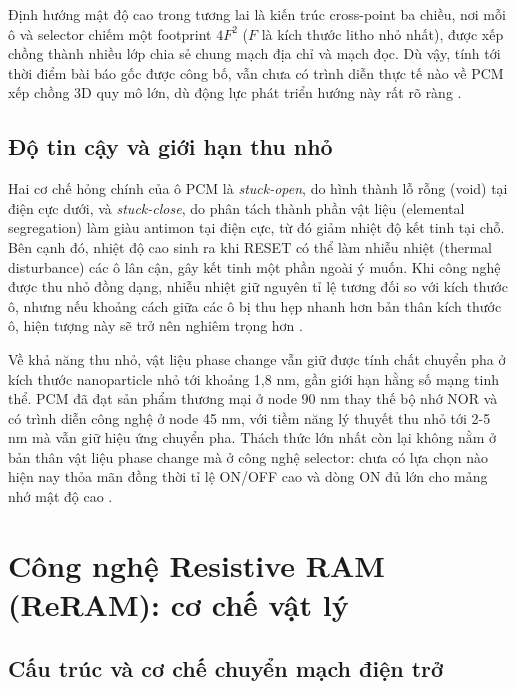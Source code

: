 \documentclass[12pt,a4paper]{article}
\begin{document}
Định hướng mật độ cao trong tương lai là kiến trúc cross-point ba chiều, nơi mỗi ô và selector chiếm một footprint $4F^2$ ($F$ là kích thước litho nhỏ nhất), được xếp chồng thành nhiều lớp chia sẻ chung mạch địa chỉ và mạch đọc. Dù vậy, tính tới thời điểm bài báo gốc được công bố, vẫn chưa có trình diễn thực tế nào về PCM xếp chồng 3D quy mô lớn, dù động lực phát triển hướng này rất rõ ràng \cite{wong2010}.

\subsection{Độ tin cậy và giới hạn thu nhỏ}

Hai cơ chế hỏng chính của ô PCM là \textit{stuck-open}, do hình thành lỗ rỗng (void) tại điện cực dưới, và \textit{stuck-close}, do phân tách thành phần vật liệu (elemental segregation) làm giàu antimon tại điện cực, từ đó giảm nhiệt độ kết tinh tại chỗ. Bên cạnh đó, nhiệt độ cao sinh ra khi RESET có thể làm nhiễu nhiệt (thermal disturbance) các ô lân cận, gây kết tinh một phần ngoài ý muốn. Khi công nghệ được thu nhỏ đồng dạng, nhiễu nhiệt giữ nguyên tỉ lệ tương đối so với kích thước ô, nhưng nếu khoảng cách giữa các ô bị thu hẹp nhanh hơn bản thân kích thước ô, hiện tượng này sẽ trở nên nghiêm trọng hơn \cite{wong2010}.

Về khả năng thu nhỏ, vật liệu phase change vẫn giữ được tính chất chuyển pha ở kích thước nanoparticle nhỏ tới khoảng 1,8 nm, gần giới hạn hằng số mạng tinh thể. PCM đã đạt sản phẩm thương mại ở node 90 nm thay thế bộ nhớ NOR và có trình diễn công nghệ ở node 45 nm, với tiềm năng lý thuyết thu nhỏ tới 2-5 nm mà vẫn giữ hiệu ứng chuyển pha. Thách thức lớn nhất còn lại không nằm ở bản thân vật liệu phase change mà ở công nghệ selector: chưa có lựa chọn nào hiện nay thỏa mãn đồng thời tỉ lệ ON/OFF cao và dòng ON đủ lớn cho mảng nhớ mật độ cao \cite{wong2010}.

\section{Công nghệ Resistive RAM (ReRAM): cơ chế vật lý}
\label{sec:reram-physics}

\subsection{Cấu trúc và cơ chế chuyển mạch điện trở}
\end{document}
